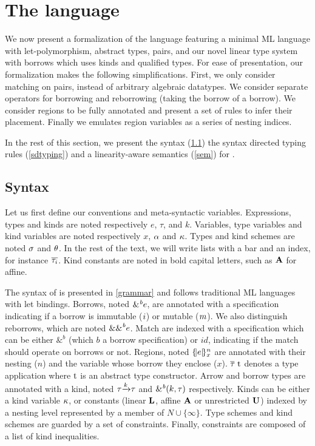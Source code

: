 \section{The \lang language}

We now present a formalization of the \lang language featuring
a minimal ML language with let-polymorphism, abstract types, pairs, and our novel
linear type system with borrows which uses kinds and qualified types.
For ease of presentation,
our formalization makes the following simplifications.
First, we only consider matching on pairs, instead of arbitrary algebraic
datatypes. We consider separate operators for borrowing and reborrowing (taking
the borrow of a borrow). We consider regions to be fully annotated
and present a set of rules to infer their placement.
Finally we emulates region variables
as a series of nesting indices.

In the rest of this section, we present the syntax (\cref{syntax})
the syntax directed typing rules (\cref{sdtyping})
and a linearity-aware semantics (\cref{sem}) for \lang.

\subsection{Syntax}
\label{syntax}

Let us first define our conventions and meta-syntactic variables.
Expressions, types and kinds are noted respectively $e$, $\tau$, and $k$.
Variables, type variables and kind variables are noted
respectively $x$, $\tvar$ and $\kvar$. Types and kind schemes
are noted $\schm$ and $\kschm$.
In the rest of the text, we will write lists with a bar and an index, for
instance $\Multi[i]{\tau}$.
Kind constants are noted in bold capital letters, such as $\kaff$ for affine.

The syntax of \lang is presented in \cref{grammar} and follows
traditional ML languages with let bindings.
Borrows, noted $\borrow{e}$, are annotated with a specification indicating
if a borrow is immutable ($\IBORROW$) or mutable ($\MBORROW$).
We also distinguish reborrows, which are noted $\reborrow{e}$.
Match are indexed with a specification which can be either $\&^b$
(which $b$ a borrow specification) or $id$, indicating if the match
should operate on borrows or not.
Regions, noted $\region{x}{e}$ are annotated with their nesting ($n$)
and the variable whose borrow they enclose ($x$).
%
$\tapp{t}{\Multi{\tau}}$ denotes a type application where
$\T t$ is an abstract type constructor.
Arrow and borrow types are annotated with a kind, noted $\tau \tarr{k} \tau$
and $\borrowty{k}{\tau}$ respectively.
%
Kinds can be either a kind variable $\kvar$, or constants
(linear $\klin$, affine $\kaff$ or unrestricted $\kun$) indexed
by a nesting level represented by a member of $N \cup \{\infty\}$.
Type schemes and kind schemes are guarded by a set of constraints.
%
Finally, constraints are composed of a list of kind inequalities.


